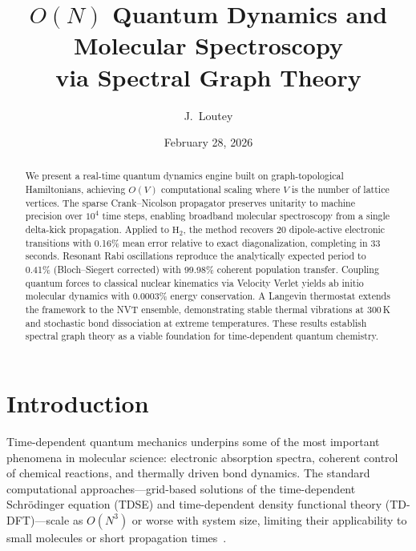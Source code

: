\documentclass[aps,pra,twocolumn,superscriptaddress,longbibliography,floatfix]{revtex4-2}
\begin{document}
\title{$O(N)$ Quantum Dynamics and Molecular Spectroscopy\\
via Spectral Graph Theory}

\author{J.~Loutey}

\date{February 28, 2026}

\begin{abstract}
We present a real-time quantum dynamics engine built on graph-topological
Hamiltonians, achieving $O(V)$ computational scaling where $V$ is the
number of lattice vertices. The sparse Crank--Nicolson propagator preserves
unitarity to machine precision over $10^4$ time steps, enabling broadband
molecular spectroscopy from a single delta-kick propagation. Applied to
$\mathrm{H}_2$, the method recovers 20 dipole-active electronic
transitions with 0.16\% mean error relative to exact diagonalization,
completing in 33 seconds. Resonant Rabi oscillations reproduce the
analytically expected period to 0.41\% (Bloch--Siegert corrected) with
99.98\% coherent population transfer. Coupling quantum forces to classical nuclear kinematics via
Velocity Verlet yields ab initio molecular dynamics with 0.0003\% energy
conservation. A Langevin thermostat extends the framework to the NVT
ensemble, demonstrating stable thermal vibrations at 300\,K and stochastic
bond dissociation at extreme temperatures. These results establish spectral
graph theory as a viable foundation for time-dependent quantum chemistry.
\end{abstract}

\maketitle

\section{Introduction}
\label{sec:introduction}

Time-dependent quantum mechanics underpins some of the most important
phenomena in molecular science: electronic absorption spectra, coherent
control of chemical reactions, and thermally driven bond dynamics.
The standard computational approaches---grid-based solutions of the
time-dependent Schr\"odinger equation (TDSE) and time-dependent density
functional theory (TD-DFT)---scale as $O(N^3)$ or worse with system
size, limiting their applicability to small molecules or short
propagation times~\cite{Marques2012,Li2020}.
\end{document}
